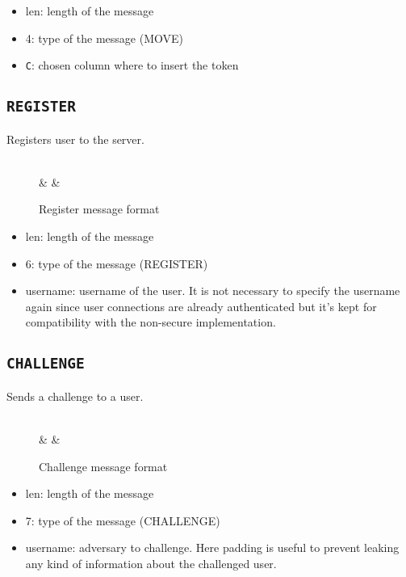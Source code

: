 \begin{itemize}
	\item len: length of the message
	\item 4: type of the message (MOVE)
	\item \texttt{C}: chosen column where to insert the token
\end{itemize}


\subsection{\texttt{REGISTER}}
Registers user to the server.
\begin{figure}[h]
	\centering
	\begin{bytefield}[bitwidth=1.1em]{19}
		 \\
		& 
		& 
	\end{bytefield}
	\caption{Register message format}
\end{figure}

\begin{itemize}
	\item len: length of the message
	\item 6: type of the message (REGISTER)
	\item username: username of the user. It is not necessary to specify the 
		username again since user connections are already authenticated
		but it's kept for compatibility with the non-secure implementation.
\end{itemize}

\subsection{\texttt{CHALLENGE}}
Sends a challenge to a user.
\begin{figure}[h]
	\centering
	\begin{bytefield}[bitwidth=1.1em]{19}
		 \\
		& 
		& 
	\end{bytefield}
	\caption{Challenge message format}
\end{figure}

\begin{itemize}
	\item len: length of the message
	\item 7: type of the message (CHALLENGE)
	\item username: adversary to challenge. Here padding is useful to prevent 
		leaking any kind of information about the challenged user.
\end{itemize}

